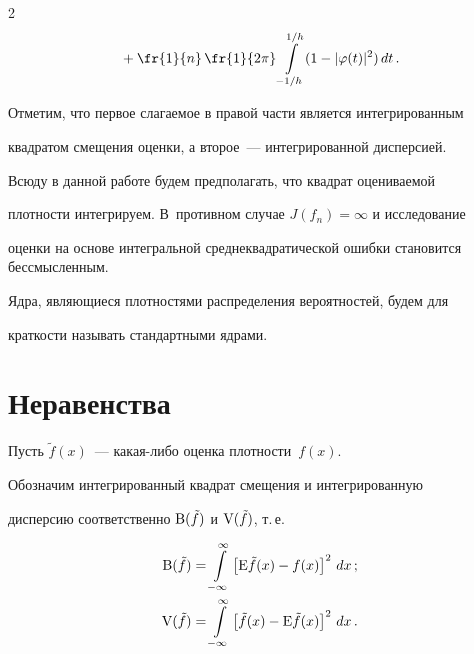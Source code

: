 \begin{multicols}{2}
\begin{multline}
{}+

\fr{1}{n}\,\fr{1}{2\pi}

\int\limits_{-1/h}^{1/h}(1-|\varphi(t)|^2)\,dt\,.

\label{e3-u1}

\end{multline}

Отметим, что первое слагаемое в правой части является интегрированным

квадратом смещения оценки, а второе~--- интегрированной дисперсией.

Всюду в данной работе будем предполагать, что квадрат оцениваемой

плотности интегрируем. В~противном случае $J(f_n)=\infty$ и исследование

оценки на основе интегральной среднеквадратической ошибки становится бессмысленным.



Ядра, являющиеся плотностями распределения вероятностей, будем для

краткости называть стандартными ядрами.



\vspace*{-3pt}



\section{Неравенства}



\vspace*{-1pt}



Пусть $\tilde f(x)$~--- какая-либо оценка плотности~$f(x)$. 

Обозначим интегрированный квадрат смещения и интегрированную

дисперсию соответственно ${\rm B}(\tilde f)$ и ${\rm V}(\tilde f)$, т.\,е.\



\noindent

\begin{align*}

{\rm B}(\tilde f)&=\int\limits_{-\infty}^\infty\left[{\rm E}\tilde f(x)-f(x)\right]^2\,dx\,;\\

{\rm V}(\tilde f)&=

\int\limits_{-\infty}^\infty\left[\tilde f(x)-{\rm E}\tilde f(x)\right]^2\,dx\,.


\end{align*}
\end{multicols}
